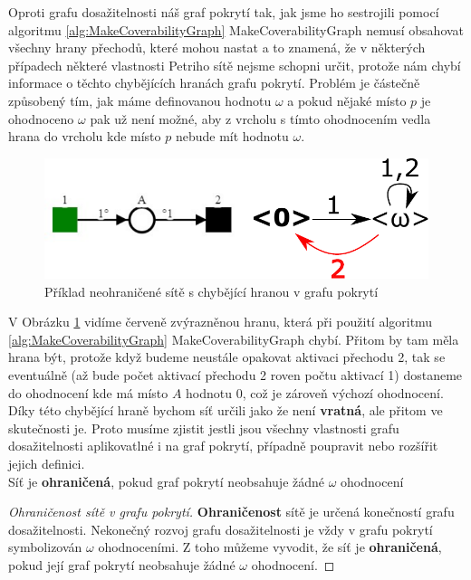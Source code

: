 \documentclass[
  biblatex,
  glossaries,
  printversion
]{kidiplom}
\begin{document}
Oproti grafu dosažitelnosti náš graf pokrytí tak, jak jsme ho sestrojili 
pomocí algoritmu \ref{alg:MakeCoverabilityGraph} MakeCoverabilityGraph 
nemusí obsahovat všechny hrany přechodů, které mohou nastat a to znamená, 
že v některých případech některé vlastnosti Petriho sítě nejsme schopni určit, 
protože nám chybí informace o těchto chybějících hranách grafu pokrytí.
Problém je částečně způsobený tím, jak máme definovanou hodnotu $\omega$ a pokud 
nějaké místo $p$ je ohodnoceno $\omega$ pak už není možné, aby z vrcholu s tímto 
ohodnocením vedla hrana do vrcholu kde místo $p$ nebude mít hodnotu $\omega$.

\clearpage
\begin{figure}[h]
  \centering
  \includegraphics[width=0.8\linewidth]{net_undecidable_reversion}
  \caption{Příklad neohraničené sítě s chybějící hranou v grafu pokrytí}\label{fig:neohraničená síť reversible}
\end{figure}
V Obrázku \ref{fig:neohraničená síť reversible} vidíme červeně zvýrazněnou 
hranu, která při použití algoritmu \ref{alg:MakeCoverabilityGraph} MakeCoverabilityGraph
chybí. Přitom by tam měla hrana být, protože když budeme neustále opakovat 
aktivaci přechodu 2, tak se eventuálně (až bude počet aktivací přechodu 2 roven počtu aktivací 1) 
dostaneme do ohodnocení kde má místo $A$
hodnotu 0, což je zároveň výchozí ohodnocení. Díky této chybějící hraně 
bychom síť určili jako že není \textbf{vratná}, ale přitom ve skutečnosti je.
Proto musíme zjistit jestli jsou všechny vlastnosti grafu dosažitelnosti 
aplikovatlné i na graf pokrytí, případně poupravit nebo rozšířit jejich definici.
\\

Síť je \textbf{ohraničená}, pokud graf pokrytí neobsahuje žádné $\omega$ ohodnocení
\begin{proof}[Ohraničenost sítě v grafu pokrytí]
  \textbf{Ohraničenost} sítě je určená konečností grafu dosažitelnosti.
  Nekonečný rozvoj grafu dosažitelnosti je vždy v grafu pokrytí symbolizován
  $\omega$ ohodnoceními. Z toho můžeme vyvodit, že síť je 
  \textbf{ohraničená}, pokud její graf pokrytí neobsahuje žádné $\omega$ ohodnocení.
\end{proof}
\end{document}
